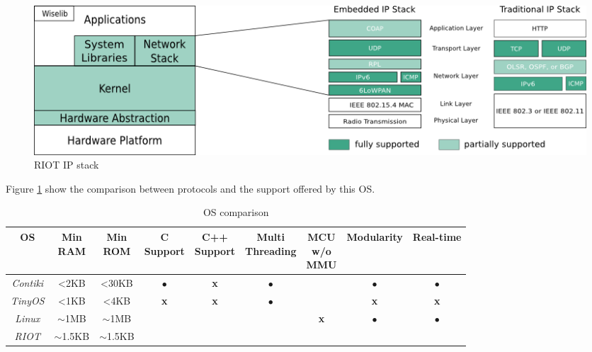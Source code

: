 \begin{figure}[htb]
	\centering
	\includegraphics[width=1\columnwidth]{chapters/background.images/RIOTIPStack.png}
	\caption{RIOT IP stack}
	\label{fig:RIOTIPStack}
\end{figure}

Figure \ref{fig:RIOTIPStack} show the comparison between protocols and the support offered by this OS. 

\begin{table}[htb]
	\centering
	\caption{OS comparison}
	\label{tab:OSComparison}
	\begin{tabular}{|c|cccccccc}
		\hline
		\textbf{OS} & 
		\multicolumn{1}{p{0.8cm}|}{\textbf{Min} \newline \textbf{RAM}} &
		\multicolumn{1}{p{0.8cm}|}{\textbf{Min} \newline \textbf{ROM}} &
		\multicolumn{1}{p{1.3cm}|}{\textbf{C} \newline \textbf{Support}} &
		\multicolumn{1}{p{1.3cm}|}{\textbf{C++} \newline \textbf{Support}} &
		\multicolumn{1}{p{1.6cm}|}{\textbf{Multi} \newline \textbf{Threading}} &
		\multicolumn{1}{p{1cm}|}{\textbf{MCU} \newline \textbf{w/o} \newline \textbf{MMU}} &
		\multicolumn{1}{c|}{\textbf{Modularity}} &
		\multicolumn{1}{c|}{\textbf{Real-time}} \\ \hline
		\textit{Contiki} & \textless 2KB & \textless 30KB &$\bullet$ & \textbf{x}       & $\bullet$     & \checkmark     &$\bullet$ &    $\bullet$ \\ \cline{1-1}
		\textit{TinyOS}  & \textless 1KB & \textless 4KB  &\textbf{x}& \textbf{x}       & $\bullet$     & \checkmark     &\textbf{x}&   \textbf{x}\\ \cline{1-1}
		\textit{Linux}   & $\mathtt{\sim}$1MB &$\mathtt{\sim}$1MB&\checkmark & \checkmark       &  \checkmark   & \textbf{x} &$\bullet$   &$\bullet$    \\ \cline{1-1}
		\textit{RIOT} & $\mathtt{\sim}$1.5KB & $\mathtt{\sim}$1.5KB & \checkmark    & \checkmark       & \checkmark & \checkmark & \checkmark & \checkmark  \\ \cline{1-1}
	\end{tabular}
\end{table}

